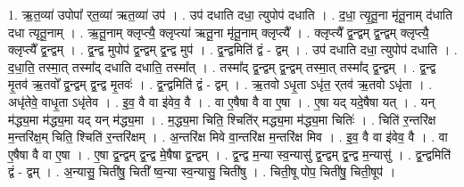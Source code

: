 \documentclass[17pt]{extarticle}
\begin{document}
1. ऋ॒त॒व्या॑ उपोपा᳚ र्‌त॒व्या॑ ऋत॒व्या॑ उप॑ । . उप॑ दधाति दधा॒ त्युपोप॑ दधाति । . द॒धा॒ त्यृ॒तू॒ना मृ॑तू॒नाम् द॑धाति दधा त्यृतू॒नाम् । . ऋ॒तू॒नाम् क्लृप्त्यै॒ क्लृप्त्या॑ ऋतू॒ना मृ॑तू॒नाम् क्लृप्त्यै᳚ । . क्लृप्त्यै᳚ द्व॒न्द्वम् द्व॒न्द्वम् क्लृप्त्यै॒ क्लृप्त्यै᳚ द्व॒न्द्वम् । . द्व॒न्द्व मुपोप॑ द्व॒न्द्वम् द्व॒न्द्व मुप॑ । . द्व॒न्द्वमिति॑ द्वं - द्वम् । . उप॑ दधाति दधा॒ त्युपोप॑ दधाति । . द॒धा॒ति॒ तस्मा॒त् तस्मा᳚द् दधाति दधाति॒ तस्मा᳚त् । . तस्मा᳚द् द्व॒न्द्वम् द्व॒न्द्वम् तस्मा॒त् तस्मा᳚द् द्व॒न्द्वम् । . द्व॒न्द्व मृ॒तव॑ ऋ॒तवो᳚ द्व॒न्द्वम् द्व॒न्द्व मृ॒तवः॑ । . द्व॒न्द्वमिति॑ द्वं - द्वम् । . ऋ॒तवो ऽधृ॒ता ऽधृ॑त॒ र्‌तव॑ ऋ॒तवो ऽधृ॑ता । . अधृ॑तेवे॒ वाधृ॒ता ऽधृ॑तेव । . इ॒व॒ वै वा इ॑वेव॒ वै । . वा ए॒षैषा वै वा ए॒षा । . ए॒षा यद् यदे॒षैषा यत् । . यन् म॑द्ध्य॒मा म॑द्ध्य॒मा यद् यन् म॑द्ध्य॒मा । . म॒द्ध्य॒मा चिति॒ श्चिति॑र् मद्ध्य॒मा म॑द्ध्य॒मा चितिः॑ । . चिति॑ र॒न्तरि॑क्ष म॒न्तरि॑क्ष॒म् चिति॒ श्चिति॑ र॒न्तरि॑क्षम् । . अ॒न्तरि॑क्ष मिवे वा॒न्तरि॑क्ष म॒न्तरि॑क्ष मिव । . इ॒व॒ वै वा इ॑वेव॒ वै । . वा ए॒षैषा वै वा ए॒षा । . ए॒षा द्व॒न्द्वम् द्व॒न्द्व मे॒षैषा द्व॒न्द्वम् । . द्व॒न्द्व म॒न्या स्व॒न्यासु॑ द्व॒न्द्वम् द्व॒न्द्व म॒न्यासु॑ । . द्व॒न्द्वमिति॑ द्वं - द्वम् । . अ॒न्यासु॒ चिती॑षु॒ चिती᳚ ष्व॒न्या स्व॒न्यासु॒ चिती॑षु । . चिती॒षू पोप॒ चिती॑षु॒ चिती॒षूप॑ । \newline
\end{document}
